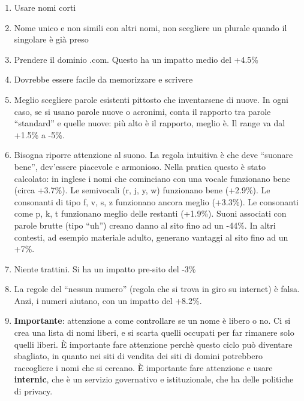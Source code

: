 \begin{enumerate}

\item Usare nomi corti
\item Nome unico e non simili con altri nomi, non scegliere un plurale quando il singolare \`e gi\`a preso
\item Prendere il dominio .com. Questo ha un impatto medio del +4.5\%
\item Dovrebbe essere facile da memorizzare e scrivere
\item Meglio scegliere parole esistenti pittosto che inventarsene di nuove. In ogni caso, se si usano parole nuove o acronimi, conta il rapporto tra parole ``standard'' e quelle nuove: pi\`u alto \`e il rapporto, meglio \`e. Il range va dal +1.5\% a -5\%.
\item Bisogna riporre attenzione al suono. La regola intuitiva \`e che deve ``suonare bene'', dev'essere piacevole e armonioso. Nella pratica questo \`e stato calcolato: in inglese i nomi che cominciano con una vocale funzionano bene (circa +3.7\%). Le semivocali (r, j, y, w) funzionano bene (+2.9\%). Le consonanti di tipo f, v, s, z funzionano ancora meglio (+3.3\%). Le consonanti come p, k, t funzionano meglio delle restanti (+1.9\%). Suoni associati con parole brutte (tipo ``uh'') creano danno al sito fino ad un -44\%. In altri contesti, ad esempio materiale adulto, generano vantaggi al sito fino ad un +7\%.
\item Niente trattini. Si ha un impatto pre-sito del -3\%
\item La regole del ``nessun numero'' (regola che si trova in giro su internet) \`e falsa. Anzi, i numeri aiutano, con un impatto del +8.2\%.
\item \textbf{Importante}: attenzione a come controllare se un nome \`e libero o no. Ci si crea una lista di nomi liberi, e si scarta quelli occupati per far rimanere solo quelli liberi. \`E importante fare attenzione perch\`e questo ciclo pu\`o diventare sbagliato, in quanto nei siti di vendita dei siti di domini potrebbero raccogliere i nomi che si cercano. \`E importante fare attenzione e usare \textbf{internic}, che \`e un servizio governativo e istituzionale, che ha delle politiche di privacy.

\end{enumerate}
